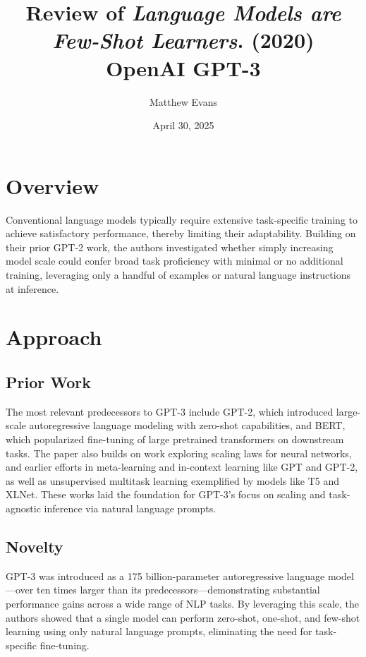 \documentclass[10pt]{article}
\title{
    Review of \textit{Language Models are Few-Shot Learners}. (2020) \\
    \small{OpenAI GPT-3}
}
\author{Matthew Evans}
\date{April 30, 2025}
\begin{document}
\maketitle

\section*{Overview}
Conventional language models typically require extensive task-specific training to achieve satisfactory performance, thereby limiting their adaptability. Building on their prior GPT-2\cite{radford2019language} work, the authors\cite{NEURIPS2020_1457c0d6} investigated whether simply increasing model scale could confer broad task proficiency with minimal or no additional training, leveraging only a handful of examples or natural language instructions at inference.

\section*{Approach}
\subsection*{Prior Work}
The most relevant predecessors to GPT-3 include GPT-2, which introduced large-scale autoregressive language modeling with zero-shot capabilities, and BERT\cite{DBLP:journals/corr/abs-1810-04805}, which popularized fine-tuning of large pretrained transformers on downstream tasks. The paper also builds on work exploring scaling laws for neural networks\cite{DBLP:journals/corr/abs-2001-08361}, and earlier efforts in meta-learning and in-context learning like GPT and GPT-2, as well as unsupervised multitask learning exemplified by models like T5\cite{DBLP:journals/corr/abs-1910-10683} and XLNet\cite{DBLP:journals/corr/abs-1906-08237}. These works laid the foundation for GPT-3's focus on scaling and task-agnostic inference via natural language prompts.

\subsection*{Novelty}
GPT-3 was introduced as a 175 billion-parameter autoregressive language model—over ten times larger than its predecessors—demonstrating substantial performance gains across a wide range of NLP tasks. By leveraging this scale, the authors showed that a single model can perform zero-shot, one-shot, and few-shot learning using only natural language prompts, eliminating the need for task-specific fine-tuning.
\end{document}
